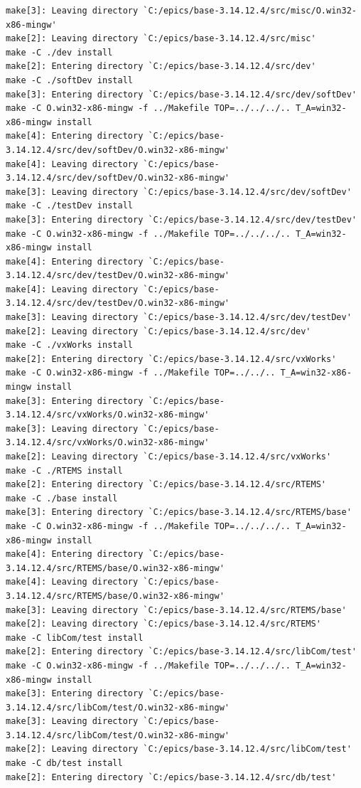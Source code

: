 \documentclass[11pt
  , a4paper
  , article
  , oneside
]{memoir}
\begin{document}
\begin{lstlisting}[style=termstyle]
make[3]: Leaving directory `C:/epics/base-3.14.12.4/src/misc/O.win32-x86-mingw'
make[2]: Leaving directory `C:/epics/base-3.14.12.4/src/misc'
make -C ./dev install
make[2]: Entering directory `C:/epics/base-3.14.12.4/src/dev'
make -C ./softDev install
make[3]: Entering directory `C:/epics/base-3.14.12.4/src/dev/softDev'
make -C O.win32-x86-mingw -f ../Makefile TOP=../../../.. T_A=win32-x86-mingw install
make[4]: Entering directory `C:/epics/base-3.14.12.4/src/dev/softDev/O.win32-x86-mingw'
make[4]: Leaving directory `C:/epics/base-3.14.12.4/src/dev/softDev/O.win32-x86-mingw'
make[3]: Leaving directory `C:/epics/base-3.14.12.4/src/dev/softDev'
make -C ./testDev install
make[3]: Entering directory `C:/epics/base-3.14.12.4/src/dev/testDev'
make -C O.win32-x86-mingw -f ../Makefile TOP=../../../.. T_A=win32-x86-mingw install
make[4]: Entering directory `C:/epics/base-3.14.12.4/src/dev/testDev/O.win32-x86-mingw'
make[4]: Leaving directory `C:/epics/base-3.14.12.4/src/dev/testDev/O.win32-x86-mingw'
make[3]: Leaving directory `C:/epics/base-3.14.12.4/src/dev/testDev'
make[2]: Leaving directory `C:/epics/base-3.14.12.4/src/dev'
make -C ./vxWorks install
make[2]: Entering directory `C:/epics/base-3.14.12.4/src/vxWorks'
make -C O.win32-x86-mingw -f ../Makefile TOP=../../.. T_A=win32-x86-mingw install
make[3]: Entering directory `C:/epics/base-3.14.12.4/src/vxWorks/O.win32-x86-mingw'
make[3]: Leaving directory `C:/epics/base-3.14.12.4/src/vxWorks/O.win32-x86-mingw'
make[2]: Leaving directory `C:/epics/base-3.14.12.4/src/vxWorks'
make -C ./RTEMS install
make[2]: Entering directory `C:/epics/base-3.14.12.4/src/RTEMS'
make -C ./base install
make[3]: Entering directory `C:/epics/base-3.14.12.4/src/RTEMS/base'
make -C O.win32-x86-mingw -f ../Makefile TOP=../../../.. T_A=win32-x86-mingw install
make[4]: Entering directory `C:/epics/base-3.14.12.4/src/RTEMS/base/O.win32-x86-mingw'
make[4]: Leaving directory `C:/epics/base-3.14.12.4/src/RTEMS/base/O.win32-x86-mingw'
make[3]: Leaving directory `C:/epics/base-3.14.12.4/src/RTEMS/base'
make[2]: Leaving directory `C:/epics/base-3.14.12.4/src/RTEMS'
make -C libCom/test install
make[2]: Entering directory `C:/epics/base-3.14.12.4/src/libCom/test'
make -C O.win32-x86-mingw -f ../Makefile TOP=../../../.. T_A=win32-x86-mingw install
make[3]: Entering directory `C:/epics/base-3.14.12.4/src/libCom/test/O.win32-x86-mingw'
make[3]: Leaving directory `C:/epics/base-3.14.12.4/src/libCom/test/O.win32-x86-mingw'
make[2]: Leaving directory `C:/epics/base-3.14.12.4/src/libCom/test'
make -C db/test install
make[2]: Entering directory `C:/epics/base-3.14.12.4/src/db/test'

\end{lstlisting}
\end{document}
